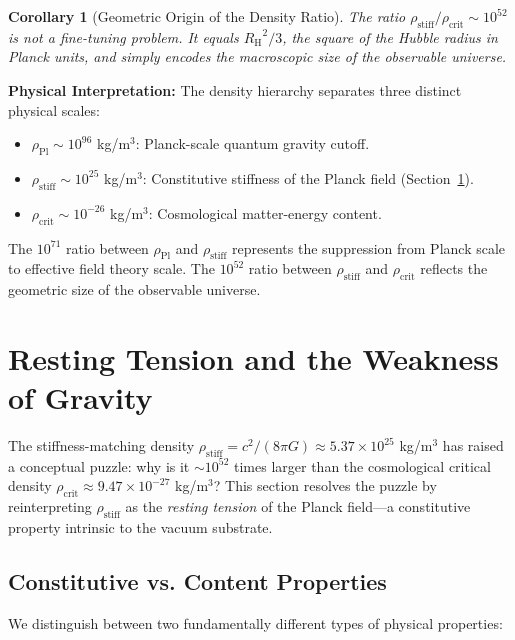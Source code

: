 \documentclass[11pt,a4paper]{article}
\newcommand{\rhocrit}{\ensuremath{\rho_{\mathrm{crit}}}}
\newcommand{\rhostiff}{\ensuremath{\rho_{\mathrm{stiff}}}}
\newcommand{\rhoPl}{\ensuremath{\rho_{\mathrm{Pl}}}}
\newcommand{\RH}{\ensuremath{R_{\mathrm{H}}}}
\newtheorem{corollary}[theorem]{Corollary}
\theoremstyle{definition}
\theoremstyle{remark}
\begin{document}
\begin{corollary}[Geometric Origin of the Density Ratio]
\label{cor:geometric_ratio}
The ratio $\rhostiff/\rhocrit \sim 10^{52}$ is not a fine-tuning problem. It equals $\RH^2/3$, the square of the Hubble radius in Planck units, and simply encodes the macroscopic size of the observable universe.
\end{corollary}

\textbf{Physical Interpretation:} The density hierarchy separates three distinct physical scales:
\begin{itemize}[leftmargin=*, itemsep=0.2em]
\item $\rhoPl \sim 10^{96}$ kg/m$^3$: Planck-scale quantum gravity cutoff.
\item $\rhostiff \sim 10^{25}$ kg/m$^3$: Constitutive stiffness of the Planck field (Section~\ref{sec:resting_tension}).
\item $\rhocrit \sim 10^{-26}$ kg/m$^3$: Cosmological matter-energy content.
\end{itemize}

The $10^{71}$ ratio between $\rhoPl$ and $\rhostiff$ represents the suppression from Planck scale to effective field theory scale. The $10^{52}$ ratio between $\rhostiff$ and $\rhocrit$ reflects the geometric size of the observable universe.

\section{Resting Tension and the Weakness of Gravity}
\label{sec:resting_tension}

The stiffness-matching density $\rhostiff = c^2/(8\pi G) \approx 5.37 \times 10^{25}$ kg/m$^3$ has raised a conceptual puzzle: why is it $\sim 10^{52}$ times larger than the cosmological critical density $\rhocrit \approx 9.47 \times 10^{-27}$ kg/m$^3$? This section resolves the puzzle by reinterpreting $\rhostiff$ as the \emph{resting tension} of the Planck field---a constitutive property intrinsic to the vacuum substrate.

\subsection{Constitutive vs. Content Properties}
\label{sec:constitutive_content}

We distinguish between two fundamentally different types of physical properties:
\end{document}
